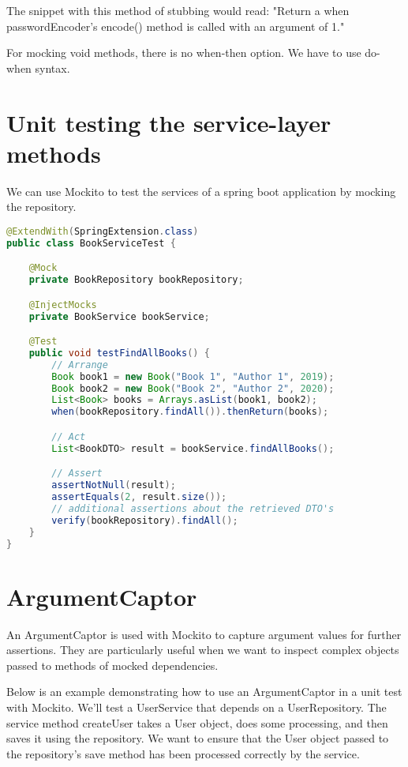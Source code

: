 The snippet with this method of stubbing would read: "Return a when passwordEncoder’s encode() method is called with an argument of 1."

For mocking void methods, there is no when-then option. We have to use do-when syntax.

\section{Unit testing the service-layer methods}


We can use Mockito to test the services of a spring boot application by mocking the repository.


\begin{lstlisting}[frame=single, language=java]
@ExtendWith(SpringExtension.class)
public class BookServiceTest {

    @Mock
    private BookRepository bookRepository;

    @InjectMocks
    private BookService bookService;

    @Test
    public void testFindAllBooks() {
        // Arrange
        Book book1 = new Book("Book 1", "Author 1", 2019);
        Book book2 = new Book("Book 2", "Author 2", 2020);
        List<Book> books = Arrays.asList(book1, book2);
        when(bookRepository.findAll()).thenReturn(books);

        // Act
        List<BookDTO> result = bookService.findAllBooks();

        // Assert
        assertNotNull(result);
        assertEquals(2, result.size());
        // additional assertions about the retrieved DTO's
        verify(bookRepository).findAll();
    }
}
\end{lstlisting}


\section{ArgumentCaptor}


An ArgumentCaptor is used with Mockito to capture argument values for further assertions. They are particularly useful when we want to inspect complex objects passed to methods of mocked dependencies.

Below is an example demonstrating how to use an ArgumentCaptor in a unit test with Mockito. We'll test a UserService that depends on a UserRepository. The service method createUser takes a User object, does some processing, and then saves it using the repository. We want to ensure that the User object passed to the repository's save method has been processed correctly by the service.

